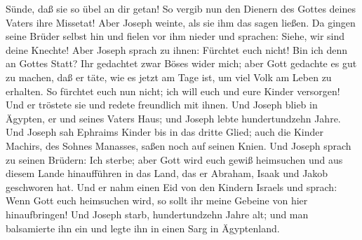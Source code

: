 Sünde, daß sie so übel an dir getan! So vergib nun den Dienern des
Gottes deines Vaters ihre Missetat! Aber Joseph weinte, als sie ihm das
sagen ließen.  Da gingen seine Brüder selbst hin und
fielen vor ihm nieder und sprachen: Siehe, wir sind deine Knechte!
 Aber Joseph sprach zu ihnen: Fürchtet euch nicht! Bin
ich denn an Gottes Statt?  Ihr gedachtet zwar Böses wider
mich; aber Gott gedachte es gut zu machen, daß er täte, wie es jetzt am
Tage ist, um viel Volk am Leben zu erhalten.  So fürchtet
euch nun nicht; ich will euch und eure Kinder versorgen! Und er tröstete
sie und redete freundlich mit ihnen.  Und Joseph blieb in
Ägypten, er und seines Vaters Haus; und Joseph lebte hundertundzehn
Jahre.  Und Joseph sah Ephraims Kinder bis in das dritte
Glied; auch die Kinder Machirs, des Sohnes Manasses, saßen noch auf
seinen Knien.  Und Joseph sprach zu seinen Brüdern: Ich
sterbe; aber Gott wird euch gewiß heimsuchen und aus diesem Lande
hinaufführen in das Land, das er Abraham, Isaak und Jakob geschworen
hat.  Und er nahm einen Eid von den Kindern Israels und
sprach: Wenn Gott euch heimsuchen wird, so sollt ihr meine Gebeine von
hier hinaufbringen!  Und Joseph starb, hundertundzehn
Jahre alt; und man balsamierte ihn ein und legte ihn in einen Sarg in
Ägyptenland.
